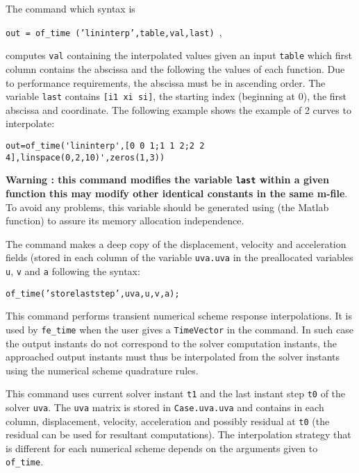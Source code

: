 
The  command which syntax is

 {\tt  out = of\_time ('lininterp',table,val,last) },

computes {\tt val} containing the interpolated values given an input {\tt table} which first column contains the abscissa and the following the values of each function. Due to performance requirements, the abscissa must be in ascending order. The variable {\tt last} contains {\tt [i1 xi si]}, the starting index (beginning at 0), the first abscissa and coordinate. The following example shows the example of 2 curves to interpolate:

\begin{verbatim}
out=of_time('lininterp',[0 0 1;1 1 2;2 2 4],linspace(0,2,10)',zeros(1,3))
\end{verbatim}%


{\bf Warning : this command modifies the variable {\tt last} within a given function this may modify other identical constants in the same m-file}. To avoid any problems, this variable should be generated using  (the Matlab function) to assure its memory allocation independence.

The  command makes a deep copy of the displacement, velocity and acceleration fields (stored in each column of {the variable \tt uva.uva} in the preallocated variables {\tt u}, {\tt v} and {\tt a} following the syntax:

 {\tt  of\_time('storelaststep',uva,u,v,a); }


This command performs transient numerical scheme response interpolations. It is used by {\tt fe\_time} when the user gives a {\tt TimeVector} in the command. In such case the output instants do not correspond to the solver computation instants, the approached output instants must thus be interpolated from the solver instants using the numerical scheme quadrature rules.

This command uses current solver instant {\tt t1} and the last instant step {\tt t0} of the solver {\tt uva}. The {\tt uva} matrix is stored in {\tt Case.uva.uva} and contains in each column, displacement, velocity, acceleration and possibly residual at {\tt t0} (the residual can be used for resultant computations). The interpolation strategy that is different for each numerical scheme depends on the arguments given to {\tt of\_time}.

